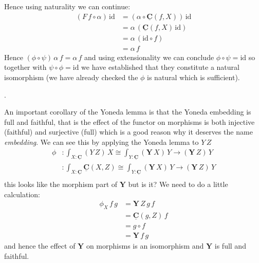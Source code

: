 \documentclass{article}
\newcommand{\cat}[1]{\underline{\mathbf{#1}}}
\newcommand{\homC}[3]{\cat{#1}(#2,#3)}
\newcommand{\id}{\mathrm{id}}
\newcommand{\Y}{\mathbf{Y}}
\newtheorem{exercise}{Exercise}
\begin{document}
Hence using naturality we can continue:
\begin{align*}
(F\, f \circ \alpha)\,\id
& = (\alpha \circ \homC{C}{f}{X})\,\id \\
& = \alpha\,(\homC{C}{f}{X}\,\id) \\
& = \alpha\,(\id \circ f) \\
& = \alpha\,f
\end{align*}
Hence $(\phi \circ \psi)\,\alpha\,f = \alpha\,f$ and using extensionality we can conclude $\phi\circ\psi = \id$ so together with $\psi\circ\phi = \id$ we have established that they constitute a natural isomorphism (we have already checked the $\phi$ is natural which is sufficient).

.%


An important corollary of the Yoneda lemma is that the Yoneda embedding is full and faithful, that is the effect of the functor on morphisms is both injective (faithful) and surjective (full) which is a good reason why it deserves the name \emph{embedding}. We can see this by applying the Yoneda lemma to $Y\,Z$
\begin{align*}
  \phi & : \int_{X:\cat{C}} (Y\,Z)\,X \cong \int_{Y : \cat{C}} (\Y\,X)\,Y \to (\Y\,Z)\,Y \\
         & : \int_{X:\cat{C}} \homC{C}{X}{Z} \cong \int_{Y : \cat{C}} (\Y\,X)\,Y \to (\Y\,Z)\,Y \\
\end{align*}
this looks like the morphism part of $\Y$ but is it? We need to do a little calculation:
\begin{align*}
\phi_X\,f\,g & = \Y\,Z\,g\,f\\
& = \homC{C}{g}{Z}\,f\\
& = g \circ f \\
& = \Y\,f\,g
\end{align*}
and hence the effect of $\Y$ on morphisms is an isomorphism and $\Y$ is full and faithful. 
\end{document}
